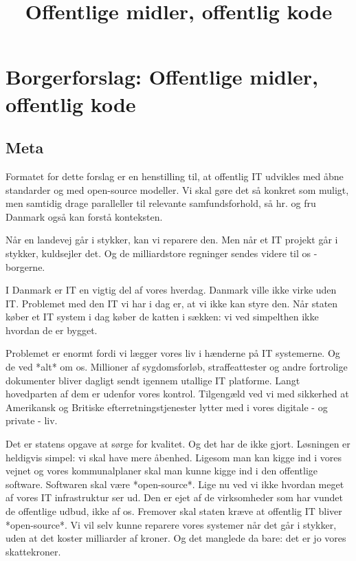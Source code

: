 \documentclass[fleqn]{article}
\title{Offentlige midler, offentlig kode}
\author{}
\begin{document}
\maketitle

\setcounter{secnumdepth}{0}

\section{Borgerforslag: Offentlige midler, offentlig kode}

\subsection{Meta}
Formatet for dette forslag er en henstilling til, at offentlig IT udvikles med åbne
standarder og med open-source modeller. Vi skal gøre det så konkret som muligt, men 
samtidig drage paralleller til relevante samfundsforhold, så hr. og fru Danmark også 
kan forstå konteksten.

Når en landevej går i stykker, kan vi reparere den. Men når et IT projekt går i stykker,
kuldsejler det. Og de milliardstore regninger sendes videre til os - borgerne.

I Danmark er IT en vigtig del af vores hverdag. Danmark ville ikke virke uden IT.
Problemet med den IT vi har i dag er, at vi ikke kan styre den. Når staten køber
et IT system i dag køber de katten i sækken: vi ved simpelthen ikke hvordan de
er bygget. 

Problemet er enormt fordi vi lægger vores liv i hænderne på IT systemerne. Og de
ved *alt* om os. Millioner af sygdomsforløb, straffeattester og andre fortrolige
dokumenter bliver dagligt sendt igennem utallige IT platforme. Langt hovedparten
af dem er udenfor vores kontrol. Tilgengæld ved vi med sikkerhed at Amerikansk
og Britiske efterretningstjenester lytter med i vores digitale - og private - liv.

Det er statens opgave at sørge for kvalitet. Og det har de ikke gjort.
Løsningen er heldigvis simpel: vi skal have mere åbenhed. 
Ligesom man kan kigge ind i vores vejnet og vores kommunalplaner skal man kunne
kigge ind i den offentlige software. Softwaren skal være *open-source*.
Lige nu ved vi ikke hvordan meget af vores IT infrastruktur ser ud.
Den er ejet af de virksomheder som har vundet de offentlige udbud, ikke af os.
Fremover skal staten kræve at offentlig IT bliver *open-source*. Vi vil selv kunne
reparere vores systemer når det går i stykker, uden at det koster milliarder af
kroner. Og det manglede da bare: det er jo vores skattekroner.
\end{document}
